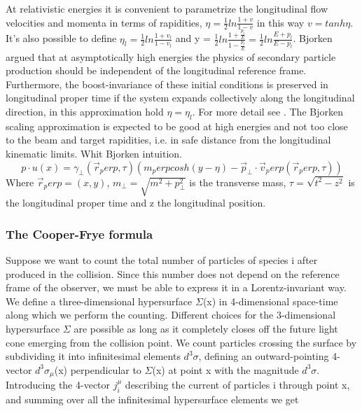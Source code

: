 \documentclass[12pt,a4paper]{book}
\begin{document}
	At relativistic energies it is convenient to parametrize the longitudinal flow velocities and momenta in terms of rapidities, $\eta= \frac{1}{2} ln \frac{1+v}{1-v}$ in this way $v = tanh \eta$. It's also possible to define $\eta_l = \frac{1}{2} ln \frac{1+v_l}{1-v_l}$ and y = $\frac{1}{2} ln \frac{1+\frac{p_l}{E}}{1-\frac{p_l}{E}}= \frac{1}{2} ln \frac{E+p_l}{E -p _l}$.  Bjorken argued that at asymptotically high energies the physics of secondary particle production should be independent of the longitudinal reference frame. Furthermore, the boost-invariance of these initial conditions is preserved in longitudinal proper time if the system expands collectively along the longitudinal direction, in this approximation hold $\eta=\eta_l$. For more detail see \cite{PhysRevD.27.140}. The Bjorken scaling approximation is expected to be good at high energies and not too close to the beam and target rapidities, i.e. in safe distance from the longitudinal kinematic limits. Whit Bjorken intuition.
	\begin{equation}
		p \cdot u(x) = \gamma_\perp(\vec{r}_perp, \tau) \left(m_perp cosh(y-\eta) - \vec{p}_\perp \cdot \vec{v}_perp(\vec{r}_perp, \tau) \right)
		\label{eq:p*u}
	\end{equation}
	Where $\vec{r}_perp=(x,y)$, $m_\perp=\sqrt{m^2 + p_\perp^2}$ is the transverse mass, $\tau=\sqrt{t^2-z^2}$ is the longitudinal proper time and z the longitudinal position. 
	
	\subsubsection{The Cooper-Frye formula}
	
	Suppose we want to count the total number of particles of species i after produced in the collision. Since this number does not depend on the reference frame of the observer, we must be able to express it in a Lorentz-invariant way. We define a three-dimensional hypersurface $\Sigma$(x) in 4-dimensional space-time along which we perform the counting. Different choices for the 3-dimensional hypersurface $\Sigma$ are possible as long as it completely closes off the future light cone emerging from the collision point. We count particles crossing the surface by subdividing it into infinitesimal elements $d^3 \sigma$, defining an outward-pointing 4-vector $d^3 \sigma_\mu$(x) perpendicular to $\Sigma$(x) at point x with the magnitude $d^3 \sigma$. Introducing the 4-vector $j^\mu_i$ describing the current of particles i through point x, and summing over all the infinitesimal hypersurface elements we get
	
\end{document}
